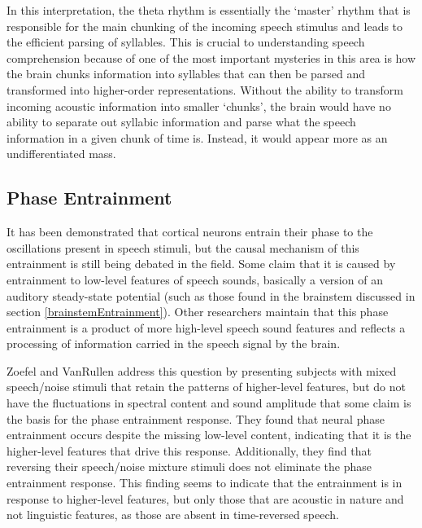 \documentclass[titlepage]{article}
\begin{document}
    In this interpretation, the theta rhythm is essentially the `master' rhythm
    that is responsible for the main chunking of the incoming speech stimulus
    and leads to the efficient parsing of syllables. This is crucial to
    understanding speech comprehension because of one of the most important
    mysteries in this area is how the brain chunks information into syllables
    that can then be parsed and transformed into higher-order representations.
    Without the ability to transform incoming acoustic information into smaller
    `chunks', the brain would have no ability to separate out syllabic
    information and parse what the speech information in a given chunk of time
    is. Instead, it would appear more as an undifferentiated mass.

  \subsection{Phase Entrainment}

    It has been demonstrated that cortical neurons entrain their phase to the
    oscillations present in speech stimuli, but the causal mechanism of this
    entrainment is still being debated in the field. Some claim that it is
    caused by entrainment to low-level features of speech sounds, basically a
    version of an auditory steady-state potential (such as those found in the
    brainstem discussed in section \ref{brainstemEntrainment}). Other
    researchers maintain that this phase entrainment is a product of more
    high-level speech sound features and reflects a processing of information
    carried in the speech signal by the brain.

    Zoefel and VanRullen \cite{Zoefel2016} address this question by presenting
    subjects with mixed speech/noise stimuli that retain the patterns of
    higher-level features, but do not have the fluctuations in spectral content
    and sound amplitude that some claim is the basis for the phase entrainment
    response. They found that neural phase entrainment occurs despite the
    missing low-level content, indicating that it is the higher-level features
    that drive this response. Additionally, they find that reversing their
    speech/noise mixture stimuli does not eliminate the phase entrainment
    response. This finding seems to indicate that the entrainment is in
    response to higher-level features, but only those that are acoustic in
    nature and not linguistic features, as those are absent in time-reversed
    speech.
\end{document}

